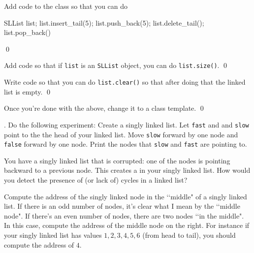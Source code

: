 {\begin{ex}
Add code to the class so that you can do
\begin{console}
SLList list;
list.insert_tail(5);
list.push_back(5);
list.delete_tail();
list.pop_back()
\end{console}
\qed
\end{ex}

\begin{ex}
Add code so that if \texttt{list} is an \texttt{SLList} object,
you can do \texttt{list.size()}.
\qed
\end{ex}


\begin{ex}
Write  code so that you can do
\texttt{list.clear()} so that
after doing that the linked list is empty.
\qed
\end{ex}

\begin{ex}
Once you're done with the above,
change it to a class template.
\qed
\end{ex}

\begin{ex}
  .
  Do the following experiment:
  Create a singly linked list.
  Let \verb!fast! and and \verb!slow! point to the
  the head of your linked list.
  Move \verb!slow! forward by one node
  and \verb!false! forward by one node.
  Print the nodes that \verb!slow! and \verb!fast! are pointing to.
\end{ex}

\begin{ex}
  You have a singly linked list that is corrupted: one of the nodes
  is pointing backward to a previous node.
  This creates a  in your singly linked list.
  How would you detect the presence of (or lack of) cycles in a linked list?
\end{ex}

\begin{ex}
  Compute the address of the singly linked node in the \lq\lq middle" of a
  singly linked list.
  If there is an odd number of nodes, it's clear what I mean by the
  \lq\lq middle node".
  If there's an even number of nodes, there are two nodes \lq\lq in the middle".
  In this case, compute the address of the middle node on the right.
  For instance if your singly linked list has values $1,2,3,4,5,$6
  (from head to tail), you should compute the address of $4$.
\end{ex}



}

